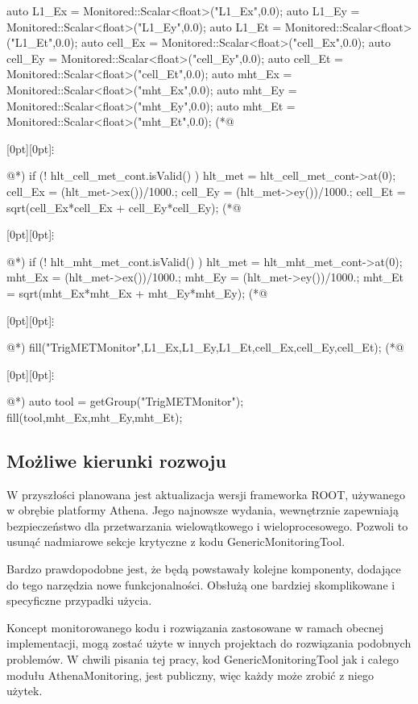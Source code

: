 \begin{cpp}[caption={Fragment kodu algorytmu~\cite{offline-fill}, odpowiadającego za wypełnienie histogramów DQ offline}, label={lst:athena:dq_histogram_fill}]
auto L1_Ex = Monitored::Scalar<float>("L1_Ex",0.0);
auto L1_Ey = Monitored::Scalar<float>("L1_Ey",0.0);
auto L1_Et = Monitored::Scalar<float>("L1_Et",0.0);
auto cell_Ex = Monitored::Scalar<float>("cell_Ex",0.0);
auto cell_Ey = Monitored::Scalar<float>("cell_Ey",0.0);
auto cell_Et = Monitored::Scalar<float>("cell_Et",0.0);
auto mht_Ex = Monitored::Scalar<float>("mht_Ex",0.0);
auto mht_Ey = Monitored::Scalar<float>("mht_Ey",0.0);
auto mht_Et = Monitored::Scalar<float>("mht_Et",0.0);
(*@\centerline{\raisebox{-1pt}[0pt][0pt]{$\vdots$}}@*)
if (! hlt_cell_met_cont.isValid() ) {
    hlt_met = hlt_cell_met_cont->at(0);
    cell_Ex = (hlt_met->ex())/1000.;
    cell_Ey = (hlt_met->ey())/1000.;
    cell_Et = sqrt(cell_Ex*cell_Ex + cell_Ey*cell_Ey);
}
(*@\centerline{\raisebox{-1pt}[0pt][0pt]{$\vdots$}}@*)
if (! hlt_mht_met_cont.isValid() ) {
    hlt_met = hlt_mht_met_cont->at(0);
    mht_Ex = (hlt_met->ex())/1000.;
    mht_Ey = (hlt_met->ey())/1000.;
    mht_Et = sqrt(mht_Ex*mht_Ex + mht_Ey*mht_Ey);
}
(*@\centerline{\raisebox{-1pt}[0pt][0pt]{$\vdots$}}@*)
fill("TrigMETMonitor",L1_Ex,L1_Ey,L1_Et,cell_Ex,cell_Ey,cell_Et);
(*@\centerline{\raisebox{-1pt}[0pt][0pt]{$\vdots$}}@*)
auto tool = getGroup("TrigMETMonitor");
fill(tool,mht_Ex,mht_Ey,mht_Et);
\end{cpp}

\subsection{Możliwe kierunki rozwoju}
W przyszłości planowana jest aktualizacja wersji frameworka ROOT, używanego w obrębie platformy Athena.
Jego najnowsze wydania, wewnętrznie zapewniają bezpieczeństwo dla przetwarzania wielowątkowego i wieloprocesowego.
Pozwoli to usunąć nadmiarowe sekcje krytyczne z kodu GenericMonitoringTool.

Bardzo prawdopodobne jest, że będą powstawały kolejne komponenty, dodające do tego narzędzia nowe funkcjonalności.
Obsłużą one bardziej skomplikowane i specyficzne przypadki użycia.  

Koncept monitorowanego kodu i rozwiązania zastosowane w ramach obecnej implementacji, mogą zostać użyte w innych projektach do rozwiązania podobnych problemów.
W chwili pisania tej pracy, kod GenericMonitoringTool jak i całego modułu AthenaMonitoring, jest publiczny, więc każdy może zrobić z niego użytek. 
